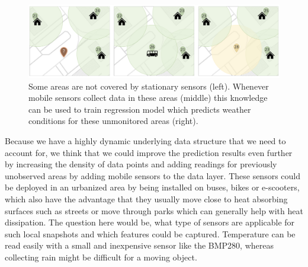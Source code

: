 \begin{figure}[h]
    \centering
    \includegraphics[width=\textwidth]{images/expose-mobile-sensor-deployment.png}
    \caption{Some areas are not covered by stationary sensors (left). Whenever mobile sensors collect data in these areas (middle) this knowledge can be used to train regression model which predicts weather conditions for these unmonitored areas (right).}
    \label{fig:mobile-sensor-deployment}
\end{figure}

Because we have a highly dynamic underlying data structure that we need to account for, we think that we could improve the prediction results even further by increasing the density of data points and adding readings for previously unobserved areas by adding mobile sensors to the data layer. These sensors could be deployed in an urbanized area by being installed on buses, bikes or e-scooters, which also have the advantage that they usually move close to heat absorbing surfaces such as streets or move through parks which can generally help with heat dissipation. The question here would be, what type of sensors are applicable for such local snapshots and which features could be captured. Temperature can be read easily with a small and inexpensive sensor like the BMP280, whereas collecting rain might be difficult for a moving object.